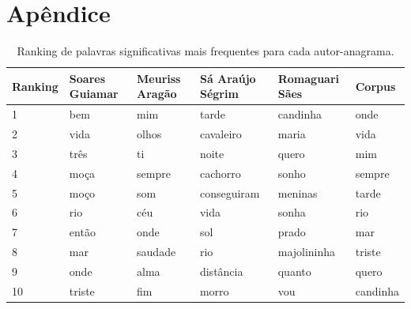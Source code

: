 \documentclass[portuguese]{textolivre}
\begin{document}
\appendix 

\section{Apêndice}\label{anexo}
\begin{table}[htbp]
\begin{threeparttable}
\caption{Ranking de palavras significativas mais frequentes para cada autor-anagrama.}
\label{tab02}
\centering
\begin{tabular}{p{2cm} p{2cm} p{2cm} p{2cm} p{2cm} p{2cm}}
\toprule
Ranking & Soares Guiamar & Meuriss Aragão & Sá Araújo Ségrim & Romaguari Sães & Corpus \\
\midrule
1 & bem & mim & tarde & candinha & onde \\
2 & vida & olhos & cavaleiro & maria & vida \\
3 & três & ti & noite & quero & mim \\
4 & moça & sempre & cachorro & sonho & sempre \\
5 & moço & som & conseguiram & meninas & tarde \\
6 & rio & céu & vida & sonha & rio \\
7 & então & onde & sol & prado & mar \\
8 & mar & saudade & rio & majolininha & triste \\
9 & onde & alma & distância & quanto & quero \\
10 & triste & fim & morro & vou & candinha \\
\bottomrule
\end{tabular}
\end{threeparttable}
\end{table}
\end{document}
